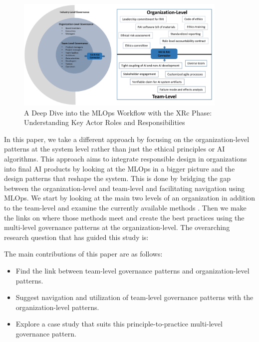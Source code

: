 \documentclass[conference]{IEEEtran}
\begin{document}
\begin{figure}[htbp!!]
	\centering
	\includegraphics[width=0.9\textwidth]{Organization.png}
	\caption{A Deep Dive into the MLOps Workflow with the XRc Phase: Understanding Key Actor Roles and Responsibilities}
	\label{XAIRAIorg}
\end{figure}
In this paper, we take a different approach by focusing on the organization-level patterns at the system level rather than just the ethical principles or AI algorithms. This approach aims to integrate responsible design in organizations into final AI products by looking at the MLOps in a bigger picture and the design patterns that reshape the system. This is done by bridging the gap between the organization-level and team-level and facilitating navigation using MLOps. We start by looking at the main two levels of an organization in addition to the team-level and examine the currently available methods \cite{Shneiderman, ShneidermanRespo, Jana, Hussain, roadmap}. Then we make the links on where those methods meet and create the best practices using the multi-level governance patterns at the organization-level. The overarching research question that has guided this study is:


\vskip 0.1in
\vskip 0.1in

\noindent{}

\vskip 0.1in
\vskip 0.1in

The main contributions of this paper are as follows:
\begin{itemize}
\item Find the link between team-level governance patterns and organization-level patterns.
\item Suggest navigation and utilization of team-level governance patterns with the organization-level patterns.
\item Explore a case study that suits this principle-to-practice multi-level governance pattern.
\end{itemize}
\smallskip
\end{document}
